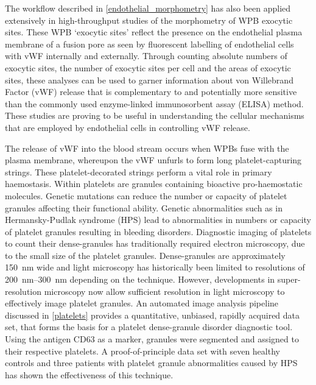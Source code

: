 The workflow described in \autoref{endothelial_morphometry} has also been applied extensively in high-throughput studies of the morphometry of WPB exocytic sites. These WPB `exocytic sites' reflect the presence on the endothelial plasma membrane of a fusion pore as seen by fluorescent labelling of endothelial cells with vWF internally and externally. Through counting absolute numbers of exocytic sites, the number of exocytic sites per cell and the areas of exocytic sites, these analyses can be used to garner information about von Willebrand Factor (vWF) release that is complementary to and potentially more sensitive than the commonly used enzyme-linked immunosorbent assay (ELISA) method. These studies are proving to be useful in understanding the cellular mechanisms that are employed by endothelial cells in controlling vWF release.

The release of vWF into the blood stream occurs when WPBs fuse with the plasma membrane, whereupon the vWF unfurls to form long platelet-capturing strings. These platelet-decorated strings perform a vital role in primary haemostasis. Within platelets are granules containing bioactive pro-haemostatic molecules. Genetic mutations can reduce the number or capacity of platelet granules affecting their functional ability. Genetic abnormalities such as in Hermansky-Pudlak syndrome (HPS) lead to abnormalities in numbers or capacity of platelet granules resulting in bleeding disorders. Diagnostic imaging of platelets to count their dense-granules has traditionally required electron microscopy, due to the small size of the platelet granules. Dense-granules are approximately \SI{150}{\nano\metre} wide and light microscopy has historically been limited to resolutions of \SIrange{200}{300}{\nano\metre} depending on the technique. However, developments in super-resolution microscopy now allow sufficient resolution in light microscopy to effectively image platelet granules. An automated image analysis pipeline discussed in \autoref{platelets} provides a quantitative, unbiased, rapidly acquired data set, that forms the basis for a platelet dense-granule disorder diagnostic tool. Using the antigen CD63 as a marker, granules were segmented and assigned to their respective platelets. A proof-of-principle data set with seven healthy controls and three patients with platelet granule abnormalities caused by HPS has shown the effectiveness of this technique.

